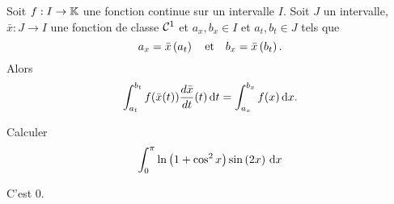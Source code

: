 \documentclass{magnoliaold}
\begin{document}
\begin{proposition}[utile=3, nom=Changement de variables]
  Soit $f:I\to\mathbb{K}$ une fonction continue sur un intervalle $I$. Soit $J$ un intervalle,
  $\bar{x}:J\to I$ une fonction de classe $\mathcal{C}^{1}$ et
  $a_x,b_x \in I$ et $a_t,b_t \in J$ tels que
  $$a_x=\bar{x}\left(a_t\right) \quad \text{et} \quad b_x=\bar{x}\left(b_t\right).$$
  Alors
  \[\int_{a_t}^{b_t} f(\bar{x}(t))\frac{d\bar{x}}{dt}(t)\,\text{d}t=\int_{a_x}^{b_x} f(x)\,\text{d}x.\]
\end{proposition}

\begin{exoUnique}
\exemple Calculer
  \[\int_{0}^{\pi} \ln\left(1+\cos^2 x\right)\sin\left(2x\right)\,\text{d}x\]
  \begin{sol}
  C'est 0.
  \end{sol}
\end{exoUnique}



\end{document}
